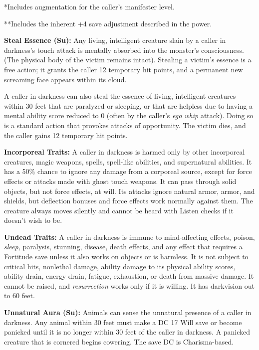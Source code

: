 \documentclass{article}
\begin{document}
*Includes augmentation for the caller's manifester level.

**Includes the inherent +4 save adjustment described in the power.

\textbf{Steal Essence (Su):} Any living, intelligent creature slain by a caller 
in darkness's touch attack is mentally absorbed into the monster's consciousness. 
(The physical body of the victim remains intact). Stealing a victim's essence is 
a free action; it grants the caller 12 temporary hit points, and a permanent new 
screaming face appears within its cloud.

A caller in darkness can also steal the essence of living, intelligent creatures 
within 30 feet that are paralyzed or sleeping, or that are helpless due to having 
a mental ability score reduced to 0 (often by the caller's \textit{ego whip }attack). 
Doing so is a standard action that provokes attacks of opportunity. The victim 
dies, and the caller gains 12 temporary hit points.

\textbf{Incorporeal Traits:} A caller in darkness is harmed only by other incorporeal 
creatures, magic weapons, spells, spell-like abilities, and supernatural abilities. 
It has a 50\% chance to ignore any damage from a corporeal source, except for force 
effects or attacks made with ghost touch weapons. It can pass through solid objects, 
but not force effects, at will. Its attacks ignore natural armor, armor, and shields, 
but deflection bonuses and force effects work normally against them. The creature 
always moves silently and cannot be heard with Listen checks if it doesn't wish 
to be. 

\textbf{Undead Traits:} A caller in darkness is immune to mind-affecting effects, 
poison, \textit{sleep, }paralysis, stunning, disease, death effects, and any effect 
that requires a Fortitude save unless it also works on objects or is harmless. 
It is not subject to critical hits, nonlethal damage, ability damage to its physical 
ability scores, ability drain, energy drain, fatigue, exhaustion, or death from 
massive damage. It cannot be raised, and \textit{resurrection }works only if it 
is willing. It has darkvision out to 60 feet.

\textbf{Unnatural Aura (Su): }Animals can sense the unnatural presence of a caller 
in darkness. Any animal within 30 feet must make a DC 17 Will save or become panicked 
until it is no longer within 30 feet of the caller in darkness. A panicked creature 
that is cornered begins cowering. The save DC is Charisma-based.
\end{document}
